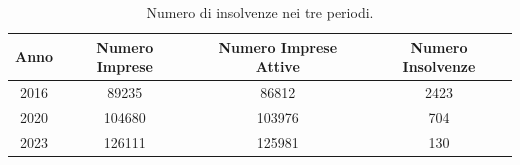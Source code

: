 \begin{table}[H]

\caption{\label{tab:table:default_by_year}Numero di insolvenze nei tre periodi.}
\centering
\begin{tabular}[t]{cccc}
\toprule
Anno & Numero Imprese & Numero Imprese Attive & Numero Insolvenze\\
\midrule
2016 & 89235 & 86812 & 2423\\
2020 & 104680 & 103976 & 704\\
2023 & 126111 & 125981 & 130\\
\bottomrule
\end{tabular}
\end{table}